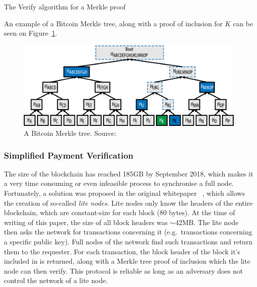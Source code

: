 \documentclass[11pt]{llncs}
\begin{document}
\begin{algorithm}[H]
  \caption{\label{alg:merkle-verification}The \textsf{Verify} algorithm
    for a Merkle proof}
    \begin{algorithmic}[1]
              \Else
              \EndIf
            \EndWhile
            \State{}
        \EndFunction
    \end{algorithmic}
\end{algorithm}

An example of a Bitcoin Merkle tree, along with a proof of inclusion for $K$ can be seen on Figure~\ref{fig:merkletree}.

\begin{figure}
  \centering
  \includegraphics[width=0.9\columnwidth,keepaspectratio]{figures/merkle-tree-proof.png}
  \caption{A Bitcoin Merkle tree. Source:~\cite{mastering}}
  \label{fig:merkletree}
\end{figure}

\subsubsection{Simplified Payment Verification}
The size of the blockchain has reached 185GB by September 2018, which makes
it a very time consuming or even infeasible process to synchronise a full
node. Fortunately, a solution was proposed in the original whitepaper
~\cite{bitcoin}, which allows the creation of so-called \textit{lite nodes}.
Lite nodes only know the headers of the entire blockchain, which are
constant-size for each block (80 bytes). At the time of writing of this
paper, the size of all block headers was $\sim$42MB. The lite node then asks the
network for transactions concerning it (e.g.\ transactions concerning a
specific public key). Full nodes of the network find such transactions and
return them to the requester. For each transaction, the block header of the
block it's included in is returned, along with a Merkle tree proof of
inclusion which the lite node can then verify. This protocol is reliable as
long as an adversary does not control the network of a lite node.
\end{document}
